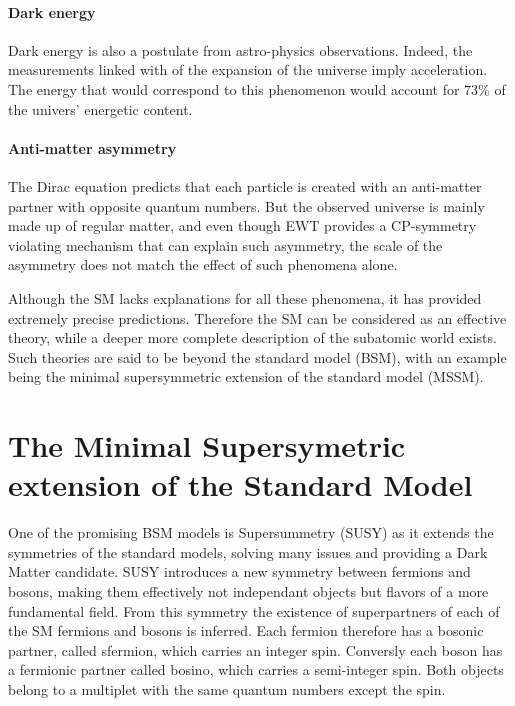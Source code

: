 \paragraph{Dark energy} Dark energy is also a postulate from astro-physics observations. Indeed, the measurements linked with of the expansion of the universe imply acceleration. The energy that would correspond to this phenomenon would account for $73\%$ of the univers' energetic content. 

\paragraph{Anti-matter asymmetry} The Dirac equation predicts that each particle is created with an anti-matter partner with opposite quantum numbers. But the observed universe is mainly made up of regular matter, and even though EWT provides a CP-symmetry violating mechanism that can explain such asymmetry, the scale of the asymmetry does not match the effect of such phenomena alone.\newline

Although the SM lacks explanations for all these phenomena, it has provided extremely precise predictions. Therefore the SM can be considered as an effective theory, while a deeper more complete description of the subatomic world exists. Such theories are said to be beyond the standard model (BSM), with an example being the minimal supersymmetric extension of the standard model (MSSM).


\section{The Minimal Supersymetric extension of the Standard Model}
\label{sec:MSSM}

One of the promising BSM models is Supersummetry (SUSY) as it extends the symmetries of the standard models, solving many issues and providing a Dark Matter candidate. SUSY \cite{Martin:1997ns} introduces a new symmetry between fermions and bosons, making them effectively not independant objects but flavors of a more fundamental field. From this symmetry the existence of superpartners of each of the SM fermions and bosons is inferred. Each fermion therefore has a bosonic partner, called sfermion, which carries an integer spin. Conversly each boson has a fermionic partner called bosino, which carries a semi-integer spin. Both objects belong to a multiplet with the same quantum numbers except the spin.\newline


